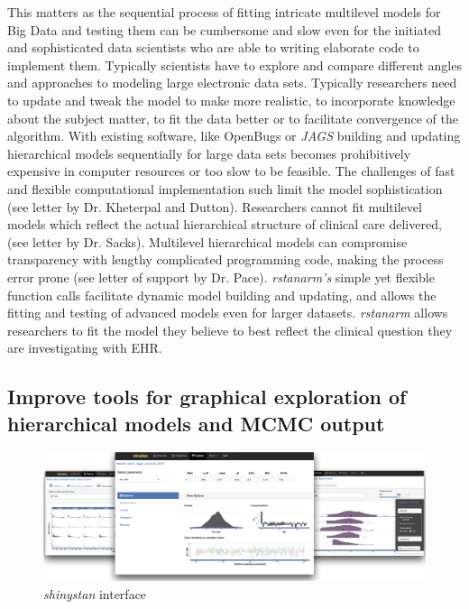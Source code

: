 \documentclass[11pt,notitlepage]{article}
\begin{document}
This matters as the sequential process of fitting intricate multilevel models for Big Data  and testing them can be cumbersome and slow even for the initiated and sophisticated data scientists who are able to writing elaborate code to implement them. Typically scientists have to explore and compare different angles and approaches to modeling large electronic data sets. Typically researchers need to update and tweak the model to make more realistic, to incorporate knowledge about the subject matter, to fit the data better or to facilitate convergence of the algorithm. With existing software, like OpenBugs or \textit{JAGS} building and updating hierarchical models sequentially for large data sets becomes prohibitively expensive in computer resources or too slow to be feasible. The challenges of fast and flexible computational implementation such limit the model sophistication (see letter by Dr. Kheterpal and Dutton). Researchers cannot fit multilevel models which reflect the actual hierarchical structure of clinical care delivered, (see letter by Dr. Sacks). Multilevel hierarchical models can compromise transparency with lengthy complicated programming code, making the process error prone (see letter of support by Dr. Pace). \textit{rstanarm's} simple yet flexible function calls facilitate dynamic model building and updating, and allows the fitting and testing of advanced models even for larger datasets. \textit{rstanarm} allows researchers to fit the model they believe to best reflect the clinical question they are investigating with EHR.

\subsection*{Improve tools for graphical exploration of hierarchical models and MCMC output}

\begin{figure}
  \vspace{-10pt}
 \includegraphics[scale=1.2]{Figures/shinystan.png}
  \vspace{-12pt}
  \caption{\textit{shinystan} interface}
    \label{fig:shinystan}
 \vspace{- 14pt}
\end{figure}
\end{document}
